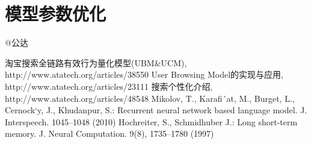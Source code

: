 \section{模型参数优化} 
	@公达

\begin{thebibliography}{99}
 淘宝搜索全链路有效行为量化模型(UBM\&UCM), http://www.atatech.org/articles/38550
 User Browsing Model的实现与应用, http://www.atatech.org/articles/23111
 搜索个性化介绍, http://www.atatech.org/articles/48548
 Mikolov, T., Karafi´at, M., Burget, L., Cernock`y, J., Khudanpur, S.: Recurrent neural network based language model. J. Interspeech. 1045–1048 (2010)
  Hochreiter, S., Schmidhuber J.: Long short-term memory. J. Neural Computation. 9(8), 1735–1780 (1997)
\end{thebibliography}

 
